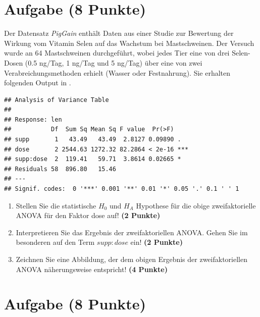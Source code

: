 \documentclass[a4paper, 10pt]{scrartcl}\usepackage[]{graphicx}\usepackage[]{xcolor}
\makeatletter
\newenvironment{kframe}{%
 \def\at@end@of@kframe{}%
 \ifinner\ifhmode%
  \def\at@end@of@kframe{\end{minipage}}%
  \begin{minipage}{\columnwidth}%
 \fi\fi%
 \def\FrameCommand##1{\hskip\@totalleftmargin \hskip-\fboxsep
 \colorbox{shadecolor}{##1}\hskip-\fboxsep
     \hskip-\linewidth \hskip-\@totalleftmargin \hskip\columnwidth}%
 \MakeFramed {\advance\hsize-\width
   \@totalleftmargin\z@ \linewidth\hsize
   \@setminipage}}%
 {\par\unskip\endMakeFramed%
 \at@end@of@kframe}
\newenvironment{knitrout}{}{} %
\makeatother
\begin{document}
\clearpage

\section{Aufgabe \hfill (8 Punkte)}



Der Datensatz \textit{PigGain} enth{\"a}lt Daten aus einer Studie zur Bewertung
der Wirkung vom Vitamin Selen auf das Wachstum bei Mastschweinen. Der
Versuch wurde an 64 Mastschweinen durchgef{\"u}hrt, wobei
jedes Tier eine von drei Selen-Dosen (0.5 ng/Tag, 1 ng/Tag und 5 ng/Tag)
{\"u}ber eine von zwei Verabreichungsmethoden erhielt (Wasser oder
Festnahrung). Sie erhalten folgenden Output in \Rlogo.

\begin{knitrout}
\color{fgcolor}\begin{kframe}
\begin{verbatim}
## Analysis of Variance Table
## 
## Response: len
##           Df  Sum Sq Mean Sq F value  Pr(>F)    
## supp       1   43.49   43.49  2.8127 0.09890 .  
## dose       2 2544.63 1272.32 82.2864 < 2e-16 ***
## supp:dose  2  119.41   59.71  3.8614 0.02665 *  
## Residuals 58  896.80   15.46                    
## ---
## Signif. codes:  0 '***' 0.001 '**' 0.01 '*' 0.05 '.' 0.1 ' ' 1
\end{verbatim}
\end{kframe}
\end{knitrout}

\begin{enumerate}
\item Stellen Sie die statistische $H_0$ und $H_A$ Hypothese f{\"u}r die obige
  zweifaktorielle ANOVA f{\"u}r den Faktor dose
  auf! \textbf{(2 Punkte)}
\item Interpretieren Sie das Ergebnis der zweifaktoriellen ANOVA. Gehen Sie
  im besonderen auf den Term $supp:dose$ ein! \textbf{(2 Punkte)}
\item Zeichnen Sie eine Abbildung, der dem obigen Ergebnis der
  zweifaktoriellen ANOVA n{\"a}herungsweise entspricht! \textbf{(4 Punkte)}
\end{enumerate}
 
\clearpage

\section{Aufgabe \hfill (8 Punkte)}
\end{document}
